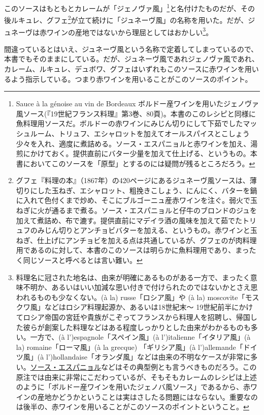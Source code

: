 \begin{recette}
このソースはもともとカレームが「ジェノヴァ風」\footnote{Sauce à la
  génoise au vin de Bordeaux
  ボルドー産ワインを用いたジェノヴァ風ソース(『19世紀フランス料理』第3巻、80頁)。本書のこのレシピと同様に魚料理用ソースだ。ボルドーの赤ワインにみじん切りにして下茹でしたマッシュルーム、トリュフ、エシャロットを加えてオールスパイスとこしょう少々を入れ、適度に煮詰める。ソース・エスパニョルと赤ワインを加え、湯煎にかけておく。提供直前にバター少量を加えて仕上げる、というもの。本書においてこのソースを「原型」とするのには疑問が残るところだろう。}と名付けたものだが、その後ルキュレ、グフェ\footnote{グフェ『料理の本』（1867年）の420ページにあるジュネーヴ風ソースは、薄切りにした玉ねぎ、エシャロット、粗挽きこしょう、にんにく、バターを鍋に入れて色付くまで炒め、そこにブルゴーニュ産赤ワインを注ぐ。弱火で玉ねぎに火が通るまで煮る。ソース・エスパニョルと仔牛のブロンドのジュを加えて煮詰め、布で漉す。提供直前にマデイラ酒の風味を加えて茹でたトリュフのみじん切りとアンチョビバターを加える、というもの。赤ワインと玉ねぎ、仕上げにアンチョビを加える点は共通しているが、グフェのが肉料理用であるのに対して、本書のこのソースは明らかに魚料理用であり、まったく同じソースと呼べるとは言い難い。}が立て続けに「ジュネーヴ風」の名称を用いた。だが、ジュネーヴは赤ワインの産地ではないから理屈としてはおかしい\footnote{料理名に冠された地名は、由来が明確にあるものがある一方で、まったく意味不明か、あるいはいい加減な思い付きで付けられたのではないかとさえ思われるものも少なくない。(à
  la) russe「ロシア風」や (à la)
  moscovite「モスクワ風」などはロシア料理起源か、あるいは18世紀末〜
  19世紀前半にかけてロシア帝国の宮廷や貴族がこぞってフランスから料理人を招聘し、帰国した彼らが創案した料理などはある程度しっかりとした由来がわかるものも多い。一方で、(à
  l')espagnole「スペイン風」(à l')italienne「イタリア風」(à la)
  romaine「ローマ風」(à la grecque) 「ギリシア風」(à
  l')allemande「ドイツ風」(à
  l')hollandaise「オランダ風」などは由来の不明なケースが非常に多い。\protect\hyperlink{sauce-espagnole}{ソース・エスパニョル}などはその典型例とも言うべきものだろう。この原注では由来に非常にこだわっているが、そもそもカレームのレシピは上述のように「ボルドー産ワインを用いたジェノバ風ソース」であるから、赤ワインの産地かどうかということは実はさしたる問題にはならない。重要なのは後半の、赤ワインを用いることがこのソースのポイントということ。}。

間違っているとはいえ、ジュネーヴ風という名称で定着してしまっているので、本書でもそのままにしている。だが、ジュネーヴ風であれジェノヴァ風であれ、カレーム、ルキュレ、デュボワ、グフェはいずれもこのソースに赤ワインを用いるよう指示している。つまり赤ワインを用いることがこのソースのポイント。


\end{recette}
